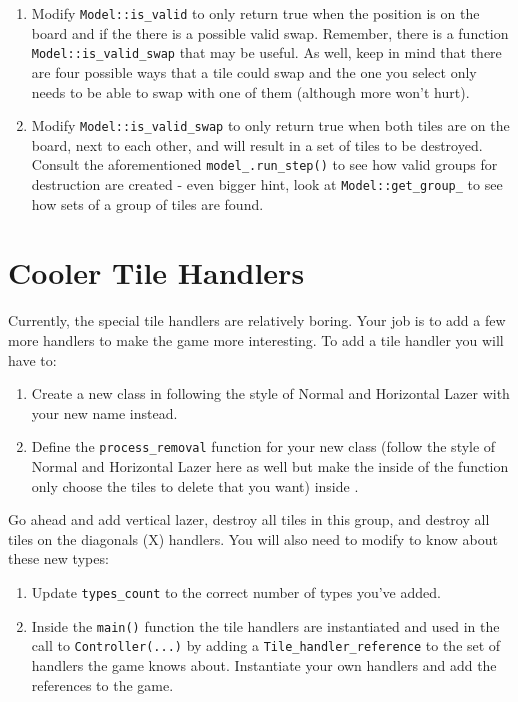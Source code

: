\documentclass{tufte-handout}
\begin{document}
\begin{enumerate}
  \item Modify \verb!Model::is_valid! to only return true when the position is
    on the board and if the there is a possible valid swap. Remember, there is
    a function \verb!Model::is_valid_swap! that may be useful. As well, keep in
    mind that there are four possible ways that a tile could swap and the one
    you select only needs to be able to swap with one of them (although more
    won't hurt).

  \item Modify \verb!Model::is_valid_swap! to only return true when both tiles
    are on the board, next to each other, and will result in a set of tiles to
    be destroyed. Consult the aforementioned \verb!model_.run_step()! to see how
    valid groups for destruction are created - even bigger hint, look at
    \verb!Model::get_group_! to see how sets of a group of tiles are found.
\end{enumerate}

\section{Cooler Tile Handlers}

Currently, the special tile handlers are relatively boring. Your job is to add
a few more handlers to make the game more interesting. To add a tile handler
you will have to:

\begin{enumerate}
  \item Create a new class in  following the style
    of Normal and Horizontal Lazer with your new name instead.

  \item Define the \verb!process_removal! function for your new class (follow
    the style of Normal and Horizontal Lazer here as well but make the inside
    of the function only choose the tiles to delete that you want) inside
    .
\end{enumerate}

Go ahead and add vertical lazer, destroy all tiles in this group, and
destroy all tiles on the diagonals (X) handlers. You will also need to modify
 to know about these new types:

\begin{enumerate}
    \item Update \verb!types_count! to the correct number of types you've added.

    \item Inside the \verb!main()! function the tile handlers are instantiated
      and used in the call to \verb!Controller(...)! by adding a
      \verb!Tile_handler_reference! to the set of handlers the game knows about.
      Instantiate your own handlers and add the references to the game.
\end{enumerate}
\end{document}
